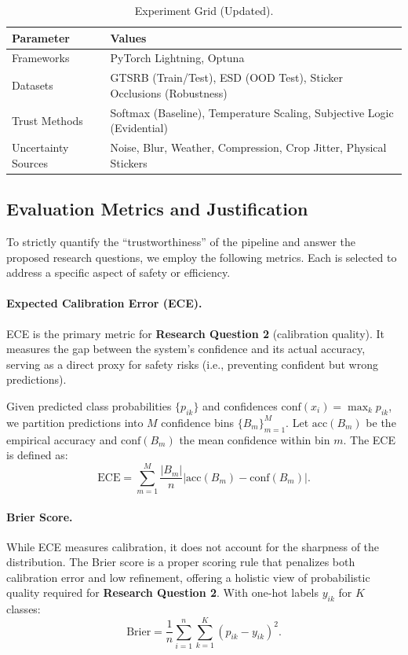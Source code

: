 \documentclass[11pt,a4paper]{article}
\begin{document}
\begin{table}[!htbp]
\centering
\small
\caption{Experiment Grid (Updated).}
\label{tab:exp-grid}
\begin{tabularx}{\linewidth}{@{} l L @{}}
\toprule
Parameter & Values \\
\midrule
Frameworks & PyTorch Lightning, Optuna \\
Datasets & GTSRB (Train/Test), ESD (OOD Test), Sticker Occlusions (Robustness) \\
Trust Methods & Softmax (Baseline), Temperature Scaling, Subjective Logic (Evidential) \\
Uncertainty Sources & Noise, Blur, Weather, Compression, Crop Jitter, Physical Stickers \\
\bottomrule
\end{tabularx}
\end{table}

\subsection{Evaluation Metrics and Justification}
To strictly quantify the ``trustworthiness'' of the pipeline and answer the proposed research questions, we employ the following metrics. Each is selected to address a specific aspect of safety or efficiency.

\paragraph{Expected Calibration Error (ECE).}
ECE is the primary metric for \textbf{Research Question 2} (calibration quality). It measures the gap between the system's confidence and its actual accuracy, serving as a direct proxy for safety risks (i.e., preventing confident but wrong predictions).

Given predicted class probabilities $\{p_{ik}\}$ and confidences $\mathrm{conf}(x_i) = \max_k p_{ik}$, we partition predictions into $M$ confidence bins $\{B_m\}_{m=1}^M$. Let $\mathrm{acc}(B_m)$ be the empirical accuracy and $\mathrm{conf}(B_m)$ the mean confidence within bin $m$. The ECE is defined as:
$$
\mathrm{ECE} = \sum_{m=1}^{M} \frac{|B_m|}{n} \left| \mathrm{acc}(B_m) - \mathrm{conf}(B_m) \right|.
$$

\paragraph{Brier Score.}
While ECE measures calibration, it does not account for the sharpness of the distribution. The Brier score is a proper scoring rule that penalizes both calibration error and low refinement, offering a holistic view of probabilistic quality required for \textbf{Research Question 2}. With one-hot labels $y_{ik}$ for $K$ classes:
$$
\mathrm{Brier} = \frac{1}{n} \sum_{i=1}^{n} \sum_{k=1}^{K} \left(p_{ik} - y_{ik}\right)^2.
$$
\end{document}
